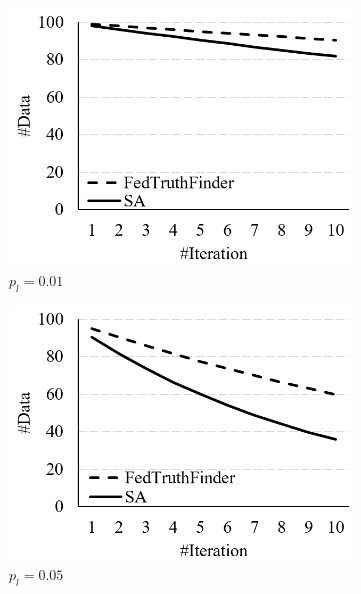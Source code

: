 \begin{figure}[t!]%
	\centering
		\begin{subfigure}[t]{.325\linewidth}
			\includegraphics[width=1\linewidth]{./fig/data_num_cl0.01.PNG}
			\caption{$p_l=0.01$}
			\label{fig:cl0.01}
		\end{subfigure}
		\begin{subfigure}[t]{.325\linewidth}
			\includegraphics[width=1\linewidth]{./fig/data_num_cl0.05.PNG}
			\caption{$p_l=0.05$}
			\label{fig:chicago}
		\end{subfigure}
		\begin{subfigure}[t]{.325\linewidth}

\end{subfigure}
\end{figure}
